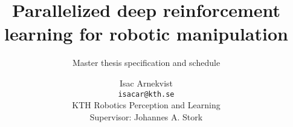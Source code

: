 \documentclass[12pt,a4paper]{scrartcl}
\title{Parallelized deep reinforcement learning for robotic manipulation}
\subtitle{Master thesis specification and schedule}
\author{Isac Arnekvist \\ \texttt{isacar@kth.se} \\ KTH Robotics Perception and Learning \\ Supervisor: Johannes A. Stork}
\begin{document}
\maketitle
\tableofcontents




{}

\end{document}
